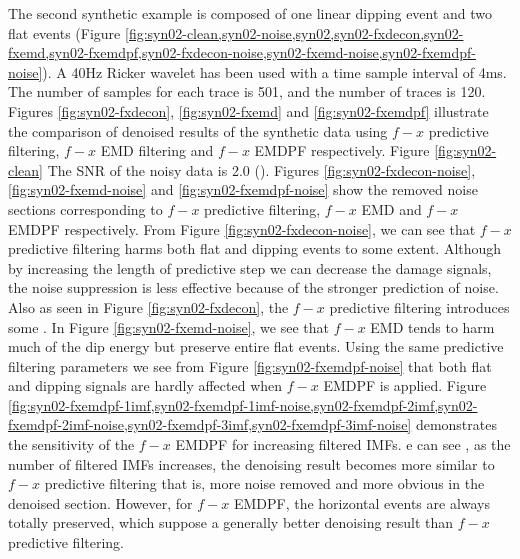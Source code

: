 The second synthetic example is composed of one linear dipping event and two flat events (Figure \ref{fig:syn02-clean,syn02-noise,syn02,syn02-fxdecon,syn02-fxemd,syn02-fxemdpf,syn02-fxdecon-noise,syn02-fxemd-noise,syn02-fxemdpf-noise}). A 40\wen{ }Hz Ricker wavelet has been used with a time sample interval of 4\wen{ }ms. The number of samples for each trace is 501, and the number of traces is 120. Figures \ref{fig:syn02-fxdecon}, \ref{fig:syn02-fxemd}\wen{,} and \ref{fig:syn02-fxemdpf} illustrate the comparison of denoised results of the synthetic data using $f-x$ predictive filtering, $f-x$ EMD filtering\wen{,} and $f-x$ EMDPF\wen{,} respectively. Figure \ref{fig:syn02-clean}  The SNR of the noisy data is 2.0 (). Figures \ref{fig:syn02-fxdecon-noise}, \ref{fig:syn02-fxemd-noise}\wen{,} and \ref{fig:syn02-fxemdpf-noise} show the removed noise sections corresponding to $f-x$ predictive filtering, $f-x$ EMD\wen{,} and $f-x$ EMDPF\wen{,} respectively. From Figure \ref{fig:syn02-fxdecon-noise}, we can see that $f-x$ predictive filtering harms both flat and dipping events to some extent. Although by increasing the length of  predictive step we can decrease the damage  signals, the noise suppression is less effective because of the stronger prediction of noise. Also\wen{,} as seen in Figure \ref{fig:syn02-fxdecon}, the $f-x$ predictive filtering introduces some . In Figure \ref{fig:syn02-fxemd-noise}, we see that $f-x$ EMD tends to harm much of the dip energy but preserve entire  flat events. Using the same predictive filtering parameters\wen{,} we see from Figure \ref{fig:syn02-fxemdpf-noise} that both flat and dipping signals are hardly affected when $f-x$ EMDPF is applied.  Figure \ref{fig:syn02-fxemdpf-1imf,syn02-fxemdpf-1imf-noise,syn02-fxemdpf-2imf,syn02-fxemdpf-2imf-noise,syn02-fxemdpf-3imf,syn02-fxemdpf-3imf-noise} demonstrates the sensitivity of the $f-x$ EMDPF for increasing  filtered IMFs. e can see , as the number of filtered IMFs increases, the denoising result becomes more similar to $f-x$ predictive filtering\dlo{,}\wen{;} that is, more noise  removed and more obvious  in the denoised section. However, for $f-x$ EMDPF, the horizontal events are always totally preserved, which suppose a generally better denoising result than $f-x$ predictive filtering.

